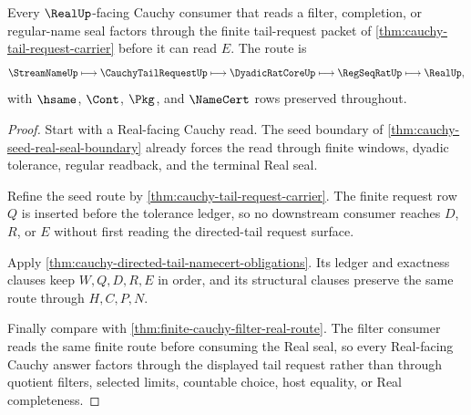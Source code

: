 \begin{theorem}
\label{thm:cauchy-filter-real-seal-route}
Every $\RealUp$-facing Cauchy consumer that reads a filter, completion, or regular-name seal factors through the finite tail-request packet of \autoref{thm:cauchy-tail-request-carrier} before it can read $E$. The route is
$$
\StreamNameUp \longmapsto \CauchyTailRequestUp \longmapsto \DyadicRatCoreUp \longmapsto \RegSeqRatUp \longmapsto \RealUp,
$$
with $\hsame$, $\Cont$, $\Pkg$, and $\NameCert$ rows preserved throughout.
\end{theorem}
\begin{proof}
Start with a Real-facing Cauchy read. The seed boundary of \autoref{thm:cauchy-seed-real-seal-boundary} already forces the read through finite windows, dyadic tolerance, regular readback, and the terminal Real seal.

Refine the seed route by \autoref{thm:cauchy-tail-request-carrier}. The finite request row $Q$ is inserted before the tolerance ledger, so no downstream consumer reaches $D$, $R$, or $E$ without first reading the directed-tail request surface.

Apply \autoref{thm:cauchy-directed-tail-namecert-obligations}. Its ledger and exactness clauses keep $W,Q,D,R,E$ in order, and its structural clauses preserve the same route through $H,C,P,N$.

Finally compare with \autoref{thm:finite-cauchy-filter-real-route}. The filter consumer reads the same finite route before consuming the Real seal, so every Real-facing Cauchy answer factors through the displayed tail request rather than through quotient filters, selected limits, countable choice, host equality, or Real completeness.
\end{proof}

